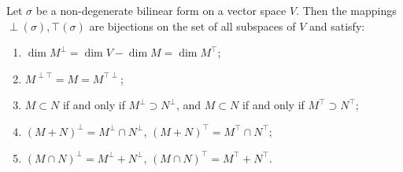 Let $\sigma$ be a non-degenerate bilinear form on a vector space $V$. Then the mappings $\perp(\sigma), \top(\sigma)$ are bijections on the set of all subspaces of $V$ and satisfy:

\begin{enumerate}
\item $\dim M^{\perp} = \dim V - \dim M = \dim M^{\top}$;
\item $M^{\perp \top} = M = M^{\top \perp}$;
\item $M \subset N$ if and only if $M^{\perp} \supset N^{\perp}$, and $M \subset N$ if and only if $M^{\top} \supset N^{\top}$;
\item $(M + N)^{\perp} = M^{\perp} \cap N^{\perp}$, \quad $(M + N)^{\top} = M^{\top} \cap N^{\top}$;
\item $(M \cap N)^{\perp} = M^{\perp} + N^{\perp}$, \quad $(M \cap N)^{\top} = M^{\top} + N^{\top}$.
\end{enumerate}
